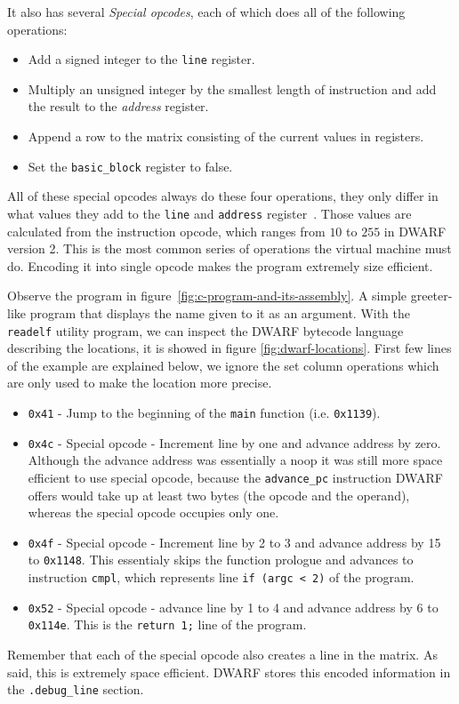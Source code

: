 It also has several \textit{Special opcodes}, each of which does all of the
following operations:
\begin{itemize}
    \item Add a signed integer to the \texttt{line} register.
    \item Multiply an unsigned integer by the smallest length of instruction
        and add the result to the \textit{address} register.
    \item Append a row to the matrix consisting of the current values in
        registers.
    \item Set the \texttt{basic\_block} register to false.
\end{itemize}
All of these special opcodes always do these four operations, they only differ
in what values they add to the \texttt{line} and \texttt{address}
register~\cite{dwarf}. Those values are calculated from the instruction opcode,
which ranges from $10$ to $255$ in DWARF version 2. This is the most common
series of operations the virtual machine must do. Encoding it into single
opcode makes the program extremely size efficient.

Observe the program in figure~\ref{fig:c-program-and-its-assembly}. A simple
greeter-like program that displays the name given to it as an argument. With
the \texttt{readelf} utility program, we can inspect the DWARF bytecode
language describing the locations, it is showed in figure
\ref{fig:dwarf-locations}. First few lines of the example are explained below,
we ignore the set column operations which are only used to make the location
more precise.
\begin{itemize}
    \item \texttt{0x41} - Jump to the beginning of the \texttt{main} function (i.e. \texttt{0x1139}).
    \item \texttt{0x4c} - Special opcode - Increment line by one and advance
        address by zero. Although the advance address was essentially a noop it
        was still more space efficient to use special opcode, because the
        \texttt{advance\_pc} instruction DWARF offers would take up at least
        two bytes (the opcode and the operand), whereas
        the special opcode occupies only one.
    \item \texttt{0x4f} - Special opcode - Increment line by 2 to 3 and advance address by 15 to \texttt{0x1148}.
        This essentialy skips the function prologue and advances to instruction \texttt{cmpl}, which represents
        line \texttt{if (argc < 2)} of the program.
    \item \texttt{0x52} - Special opcode - advance line by 1 to 4 and advance address by 6 to \texttt{0x114e}.
        This is the \texttt{return 1;} line of the program.
\end{itemize}
Remember that each of the special opcode also creates a line in the matrix. As
said, this is extremely space efficient. DWARF stores this encoded information
in the \verb|.debug_line| section.

